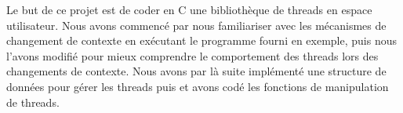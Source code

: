 

Le but de ce projet est de coder en C une bibliothèque de threads en
espace utilisateur. Nous avons commencé par nous familiariser avec les
mécanismes de changement de contexte en exécutant le programme fourni
en exemple, puis nous l'avons modifié pour mieux comprendre le
comportement des threads lors des changements de contexte. Nous avons
par là suite implémenté une structure de données pour gérer les
threads puis et avons codé les fonctions de manipulation de threads.


